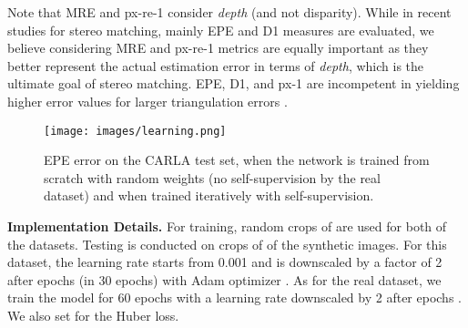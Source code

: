 \documentclass[10pt,twocolumn,letterpaper]{article}
\begin{document}
Note that MRE and px-re-1 consider \emph{depth} (and not disparity). While in recent studies for stereo matching, mainly EPE and D1 measures are evaluated, we believe considering MRE and px-re-1 metrics are equally important as they better represent the actual estimation error in terms of \emph{depth}, which is the ultimate goal of stereo matching. EPE, D1, and px-1 are incompetent in yielding higher error values for larger triangulation errors \cite{van2006real}. 
\begin{figure}[t]
	\begin{center}
		\texttt{[image: images/learning.png]}
	\end{center}
	\vspace{-0.8cm}
	\caption{EPE error on the CARLA test set, when the network is trained from scratch with random weights (no self-supervision by the real dataset) and when trained iteratively with self-supervision.}
	\label{fig:learning}
\end{figure} 
\noindent\textbf{Implementation Details.} For training, random crops of  are used for both of the datasets. Testing is conducted on crops of  of the synthetic images. For this dataset, the learning rate starts from 0.001 and is downscaled by a factor of 2 after epochs  (in 30 epochs) with Adam optimizer \cite{kingma2014adam}. As for the real dataset, we train the model for 60 epochs with a learning rate downscaled by 2 after epochs . We also set  for the Huber loss.
\end{document}
